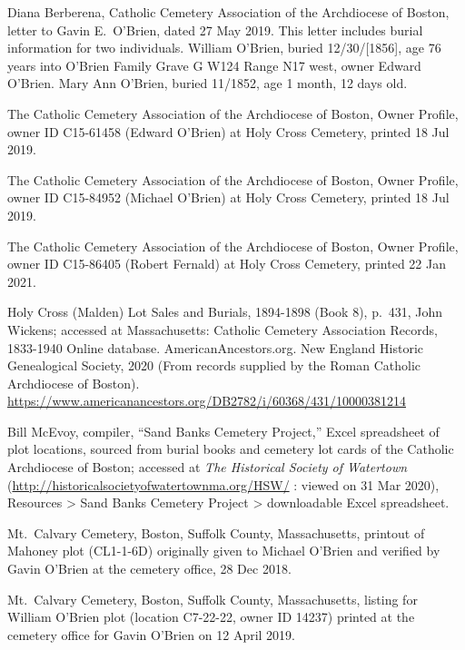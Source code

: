 \begin{thebibliography}{99}

Diana Berberena, Catholic Cemetery Association of the Archdiocese of Boston, letter to Gavin E.\ O'Brien, dated 27 May 2019. This letter includes burial information for two individuals. William O'Brien, buried 12/30/[1856], age 76 years into O'Brien Family Grave G W124 Range N17 west, owner Edward O'Brien. Mary Ann O'Brien, buried 11/1852, age 1 month, 12 days old.

The Catholic Cemetery Association of the Archdiocese of Boston, Owner Profile, owner ID C15-61458 (Edward O'Brien) at Holy Cross Cemetery, printed 18 Jul 2019.

The Catholic Cemetery Association of the Archdiocese of Boston, Owner Profile, owner ID C15-84952 (Michael O'Brien) at Holy Cross Cemetery, printed 18 Jul 2019.

The Catholic Cemetery Association of the Archdiocese of Boston, Owner Profile, owner ID C15-86405 (Robert Fernald) at Holy Cross Cemetery, printed 22 Jan 2021.

Holy Cross (Malden) Lot Sales and Burials, 1894-1898 (Book 8), p.\ 431, John Wickens; accessed at Massachusetts: Catholic Cemetery Association Records, 1833-1940 Online database. AmericanAncestors.org. New England Historic Genealogical Society, 2020 (From records supplied by the Roman Catholic Archdiocese of Boston).
\url{https://www.americanancestors.org/DB2782/i/60368/431/10000381214}

Bill McEvoy, compiler, ``Sand Banks Cemetery Project,'' Excel spreadsheet of plot locations, sourced from burial books and cemetery lot cards of the Catholic Archdiocese of Boston; accessed at \textit{The Historical Society of Watertown} (\url{http://historicalsocietyofwatertownma.org/HSW/} : viewed on 31 Mar 2020), Resources > Sand Banks Cemetery Project > downloadable Excel spreadsheet.

Mt.\ Calvary Cemetery, Boston, Suffolk County, Massachusetts, printout of Mahoney plot (CL1-1-6D) originally given to Michael O'Brien and verified by Gavin O'Brien at the cemetery office, 28 Dec 2018.

Mt.\ Calvary Cemetery, Boston, Suffolk County, Massachusetts, listing for William O'Brien plot (location C7-22-22, owner ID 14237) printed at the cemetery office for Gavin O'Brien on 12 April 2019.

\end{thebibliography}
